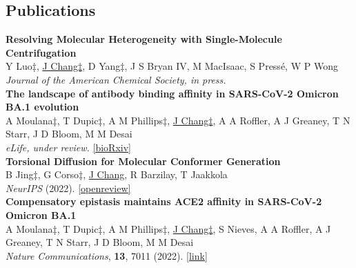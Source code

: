 \documentclass[margin,11pt]{res}
\begin{document}
\begin{resume}



\section{Publications}

\begin{changemargin}{-8.5em}{0em}
  \bigskip
  \bigskip
  \textbf{Resolving Molecular Heterogeneity with Single-Molecule Centrifugation}
    \\
    Y Luo‡, \underline{J Chang‡}, D Yang‡, J S Bryan IV, M MacIsaac, S Pressé, W P Wong
    \\
    \textit{Journal of the American Chemical Society, in press.}
    \\

    \textbf{The landscape of antibody binding affinity in SARS-CoV-2 Omicron BA.1 evolution}
    \\
    A Moulana‡, T Dupic‡, A M Phillips‡, \underline{J Chang‡}, A A Roffler, A J Greaney, T N Starr, J D Bloom, M M Desai
    \\
    \textit{eLife, under review.}
    \href{https://www.biorxiv.org/content/10.1101/2022.09.13.507781.abstract}{[bioRxiv]}
    \\

    \textbf{Torsional Diffusion for Molecular Conformer Generation}
    \\
    B Jing‡, G Corso‡, \underline{J Chang}, R Barzilay, T Jaakkola
    \\
    \textit{NeurIPS}
    (2022).
    \href{https://openreview.net/forum?id=w6fj2r62r_H}{[openreview]}
    \\

    \textbf{Compensatory epistasis maintains ACE2 affinity in SARS-CoV-2 Omicron BA.1}
    \\
    A Moulana‡, T Dupic‡, A M Phillips‡, \underline{J Chang‡}, S Nieves, A A Roffler, A J Greaney, T N Starr, J D Bloom, M M Desai
    \\
    \textit{Nature Communications},
    \textbf{13},
    7011
    (2022).
    \href{https://doi.org/10.1038/s41467-022-34506-z}{[link]}
    \\


\end{changemargin}
\end{resume}
\end{document}
